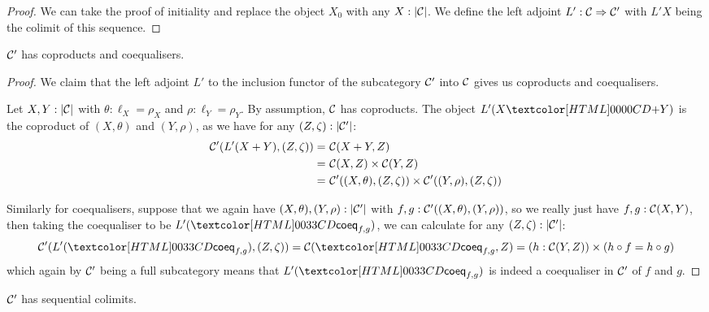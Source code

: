 \begin{proof}
  We can take the proof of initiality and replace the object $X_0$
  with any $X : | \mathcal{C} |$. We define the left adjoint
  $L' : \mathcal{C} \Rightarrow \mathcal{C}'$ with $L' X$ being the colimit of this
  sequence.
\end{proof}

\begin{proposition}
  $\mathcal{C}'$ has coproducts and coequalisers.
\end{proposition}

\begin{proof}
  We claim that the left adjoint $L'$ to the inclusion functor of the
  subcategory $\mathcal{C}'$ into $\mathcal{C}$ gives us coproducts and coequalisers. 

  Let $X, Y : | \mathcal{C} |$ with $\theta : \ell_X = \rho_X$ and
  $\rho : \ell_Y = \rho_Y$. By assumption, $\mathcal{C}$ has coproducts. The
  object $L' (\coproduct{X}{Y})$ is the coproduct of $(X,\theta)$ and $(Y,\rho)$,
  as we have for any $(Z,\zeta) : | \mathcal{C}' |$:
  \begin{align*}
  \mathcal{C}'(L'(X+Y),(Z,\zeta)) =&\ \mathcal{C}(X+Y,Z) \\
    =&\ \mathcal{C}(X,Z) \times \mathcal{C}(Y,Z) \\
    =&\ \mathcal{C}'((X,\theta),(Z,\zeta)) \times \mathcal{C}'((Y,\rho),(Z,\zeta))
  \end{align*}

  Similarly for coequalisers, suppose that we again have
  $(X,\theta), (Y,\rho) : | \mathcal{C}' |$ with
  $f, g : \mathcal{C}'((X,\theta),(Y,\rho))$, so we really just have
  $f, g : \mathcal{C}(X,Y)$, then taking the coequaliser to be
  $L' (\coeqty{f}{g})$, we can calculate for any $(Z,\zeta) : | \mathcal{C}' |$:
  $$
  \Cc'(L'(\coeqty{f}{g}),(Z,\zeta)) = \Cc(\coeqty{f}{g}, Z) = (h : \Cc(Y,Z)) \times (h \circ f = h \circ g)
  $$
  which again by $\mathcal{C}'$ being a full subcategory means that
  $L'(\coeqty{f}{g})$ is indeed a coequaliser in $\mathcal{C}'$ of $f$ and $g$.
\end{proof}

\begin{proposition}
  $\mathcal{C}'$ has sequential colimits.
\end{proposition}

